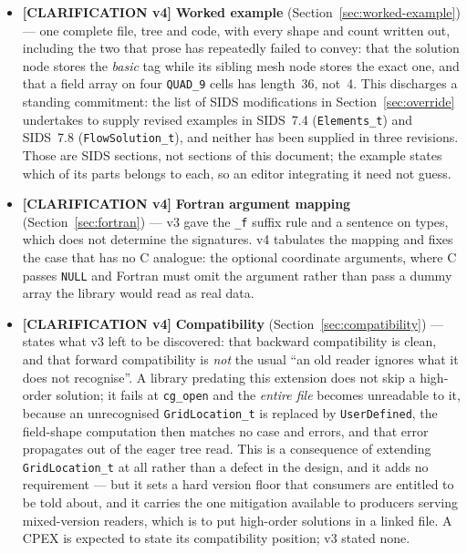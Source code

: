 \documentclass[11pt,letterpaper]{article}
\newif\ifvfourdraft
\newenvironment{v4block}{\ifvfourdraft\color{v4violet}\fi\ignorespaces}{\par}
\newcommand{\CLARIFYIV}{\ifvfourdraft
  \textcolor{v4violet}{\textbf{[CLARIFICATION v4]}}\else
  \textcolor{clarifybrown}{\textbf{[CLARIFICATION v4]}}\fi}
\begin{document}
{\begin{v4block}
\begin{itemize}[nosep,leftmargin=1.5em]
  \item \CLARIFYIV{} \textbf{Worked example} (Section~\ref{sec:worked-example})
    --- one complete file, tree and code, with every shape and count written out,
    including the two that prose has repeatedly failed to convey: that the
    solution node stores the \emph{basic} tag while its sibling mesh node stores
    the exact one, and that a field array on four \texttt{QUAD\_9} cells has
    length~36, not~4.  This discharges a standing commitment: the list of SIDS
    modifications in Section~\ref{sec:override} undertakes to supply revised
    examples in SIDS~7.4 (\texttt{Elements\_t}) and SIDS~7.8
    (\texttt{FlowSolution\_t}), and neither has been supplied in three revisions.
    Those are SIDS sections, not sections of this document; the example states
    which of its parts belongs to each, so an editor integrating it need not
    guess.

  \item \CLARIFYIV{} \textbf{Fortran argument mapping}
    (Section~\ref{sec:fortran}) --- v3 gave the \texttt{\_f} suffix rule and a
    sentence on types, which does not determine the signatures.  v4 tabulates the
    mapping and fixes the case that has no C analogue: the optional coordinate
    arguments, where C passes \texttt{NULL} and Fortran must omit the argument
    rather than pass a dummy array the library would read as real data.

  \item \CLARIFYIV{} \textbf{Compatibility} (Section~\ref{sec:compatibility}) ---
    states what v3 left to be discovered: that backward compatibility is clean, and
    that forward compatibility is \emph{not} the usual ``an old reader ignores what
    it does not recognise''.  A library predating this extension does not skip a
    high-order solution; it fails at \texttt{cg\_open} and the \emph{entire file}
    becomes unreadable to it, because an unrecognised \texttt{GridLocation\_t} is
    replaced by \texttt{UserDefined}, the field-shape computation then matches no
    case and errors, and that error propagates out of the eager tree read.  This is
    a consequence of extending \texttt{GridLocation\_t} at all rather than a defect
    in the design, and it adds no requirement --- but it sets a hard version floor
    that consumers are entitled to be told about, and it carries the one mitigation
    available to producers serving mixed-version readers, which is to put
    high-order solutions in a linked file.  A CPEX is expected to state its
    compatibility position; v3 stated none.
\end{itemize}


\end{v4block}}
\end{document}
